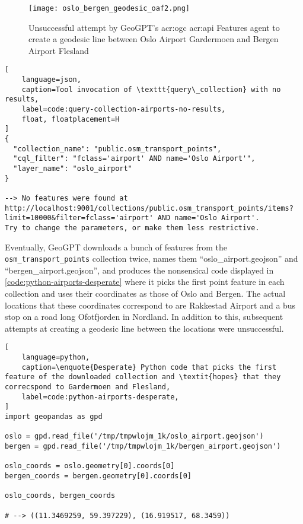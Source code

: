 \begin{figure}[htbp]
    \centering
    \texttt{[image: oslo\_bergen\_geodesic\_oaf2.png]}
    \caption{Unsuccessful attempt by GeoGPT's \acrshort{acr:ogc} \acrshort{acr:api} Features agent to create a geodesic line between Oslo Airport Gardermoen and Bergen Airport Flesland}
    \label{fig:oaf-geodesic-unsuccessful}
\end{figure}

\FloatBarrier

\begin{lstlisting}[
    language=json,
    caption=Tool invocation of \texttt{query\_collection} with no results,
    label=code:query-collection-airports-no-results,
    float, floatplacement=H
]
{
  "collection_name": "public.osm_transport_points",
  "cql_filter": "fclass='airport' AND name='Oslo Airport'",
  "layer_name": "oslo_airport"
}

--> No features were found at http://localhost:9001/collections/public.osm_transport_points/items?limit=10000&filter=fclass='airport' AND name='Oslo Airport'.
Try to change the parameters, or make them less restrictive.
\end{lstlisting}

Eventually, GeoGPT downloads a bunch of features from the \texttt{osm\_transport\_points} collection twice, names them \enquote{oslo\_airport.geojson} and \enquote{bergen\_airport.geojson}, and produces the nonsensical code displayed in \autoref{code:python-airports-desperate} where it picks the first point feature in each collection and uses their coordinates as those of Oslo and Bergen. The actual locations that these coordinates correspond to are Rakkestad Airport and a bus stop on a road long Ofotfjorden in Nordland. In addition to this, subsequent attempts at creating a geodesic line between the locations were unsuccessful.

\FloatBarrier

\begin{lstlisting}[
    language=python,
    caption=\enquote{Desperate} Python code that picks the first feature of the downloaded collection and \textit{hopes} that they correcspond to Gardermoen and Flesland,
    label=code:python-airports-desperate,
]
import geopandas as gpd

oslo = gpd.read_file('/tmp/tmpwlojm_1k/oslo_airport.geojson')
bergen = gpd.read_file('/tmp/tmpwlojm_1k/bergen_airport.geojson')

oslo_coords = oslo.geometry[0].coords[0]
bergen_coords = bergen.geometry[0].coords[0]

oslo_coords, bergen_coords   

# --> ((11.3469259, 59.397229), (16.919517, 68.3459))
\end{lstlisting}

